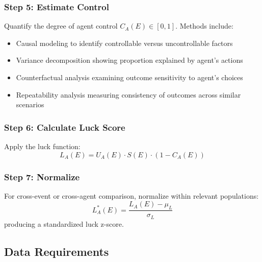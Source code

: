 \subsubsection{Step 5: Estimate Control}

Quantify the degree of agent control $C_{A}(E) \in [0,1]$. Methods include:
\begin{itemize}
  \item Causal modeling to identify controllable versus uncontrollable factors

  \item Variance decomposition showing proportion explained by agent's actions

  \item Counterfactual analysis examining outcome sensitivity to agent's
    choices

  \item Repeatability analysis measuring consistency of outcomes across similar
    scenarios
\end{itemize}

\subsubsection{Step 6: Calculate Luck Score}

Apply the luck function:
\begin{equation}
  L_{A}(E) = U_{A}(E) \cdot S(E) \cdot (1 - C_{A}(E))
\end{equation}

\subsubsection{Step 7: Normalize}

For cross-event or cross-agent comparison, normalize within relevant
populations:
\begin{equation}
  L_{A}^{*}(E) = \frac{L_{A}(E) - \mu_{L}}{\sigma_{L}}
\end{equation}
producing a standardized luck z-score.

\subsection{Data Requirements}

